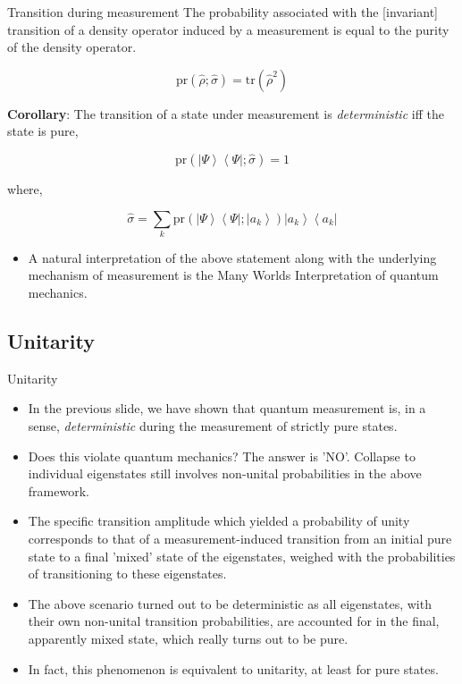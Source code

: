\documentclass[9pt,handout]{beamer}
\newcommand{\pr}[0]{\text{pr}}
\newcommand{\tr}[0]{\text{tr}}
\begin{document}
\begin{frame}{}
\begin{block}{Transition during measurement}
The probability associated with the [invariant] transition of a density operator induced by a measurement is equal to the purity of the density operator.

$$\pr \left( \widehat{\rho}; \widehat{\sigma} \right) = \tr \left( \widehat{\rho}^2 \right)$$

\textbf{Corollary}: The transition of a state under measurement is \emph{deterministic} iff the state is pure,

$$\pr \left( \left\lvert \Psi \right\rangle \left\langle \Psi \right\rvert; \widehat{\sigma} \right) = 1$$

where,

$$\widehat{\sigma} = \sum_k \pr \left( \left\lvert \Psi \right\rangle \left\langle \Psi \right\rvert; \left\lvert a_k \right\rangle \right) \left\lvert a_k \right\rangle \left\langle a_k \right\rvert$$
\end{block}

\begin{itemize}
\item A natural interpretation of the above statement along with the underlying mechanism of measurement is the Many Worlds Interpretation of quantum mechanics.
\end{itemize}
\end{frame}

\subsection{Unitarity}
\begin{frame}{Unitarity}
\begin{itemize}
\item In the previous slide, we have shown that quantum measurement is, in a sense, \emph{deterministic} during the measurement of strictly pure states.

\item Does this violate quantum mechanics? The answer is 'NO'. 
Collapse to individual eigenstates still involves non-unital probabilities in the above framework.

\item The specific transition amplitude which yielded a probability of unity corresponds to that of a measurement-induced transition from an initial pure state to a final 'mixed' state of the eigenstates, weighed with the probabilities of transitioning to these eigenstates.

\item The above scenario turned out to be deterministic as all eigenstates, with their own non-unital transition probabilities, are accounted for in the final, apparently mixed state, which really turns out to be pure.

\item In fact, this phenomenon is equivalent to unitarity, at least for pure states.
\end{itemize}
\end{frame}
\end{document}
